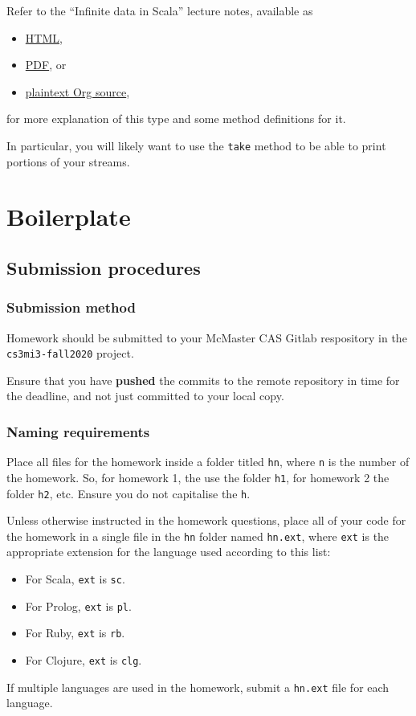 \documentclass[11pt]{article}
\begin{document}
Refer to the “Infinite data in Scala” lecture notes, available as
\begin{itemize}
\item \href{./../notes/live-coding/10-02-infinite-data-in-Scala.html}{HTML},
\item \href{./../notes/live-coding/10-02-infinite-data-in-Scala.pdf}{PDF}, or
\item \href{./../notes/live-coding/10-02-infinite-data-in-Scala.org}{plaintext Org source},
\end{itemize}
for more explanation of this type
and some method definitions for it.

In particular, you will likely want to use the \texttt{take} method
to be able to print portions of your streams.

\section*{Boilerplate}
\label{sec:org7c11053}
\subsection*{Submission procedures}
\label{sec:orgc93bf52}
\subsubsection*{Submission method}
\label{sec:org6880597}

Homework should be submitted to your McMaster CAS Gitlab respository
in the \texttt{cs3mi3-fall2020} project.

Ensure that you have \textbf{pushed} the commits to the remote repository
in time for the deadline, and not just committed to your local copy.

\subsubsection*{Naming requirements}
\label{sec:org6c59d54}

Place all files for the homework
inside a folder titled \texttt{hn}, where \texttt{n} is the number of the homework.
So, for homework 1, the use the folder \texttt{h1}, for homework 2 the folder \texttt{h2}, etc.
Ensure you do not capitalise the \texttt{h}.

Unless otherwise instructed in the homework questions,
place all of your code for the homework
in a single file in the \texttt{hn} folder named \texttt{hn.ext},
where \texttt{ext} is the appropriate extension for the language used
according to this list:
\begin{itemize}
\item For Scala, \texttt{ext} is \texttt{sc}.
\item For Prolog, \texttt{ext} is \texttt{pl}.
\item For Ruby, \texttt{ext} is \texttt{rb}.
\item For Clojure, \texttt{ext} is \texttt{clg}.
\end{itemize}
If multiple languages are used in the homework,
submit a \texttt{hn.ext} file for each language.
\end{document}
